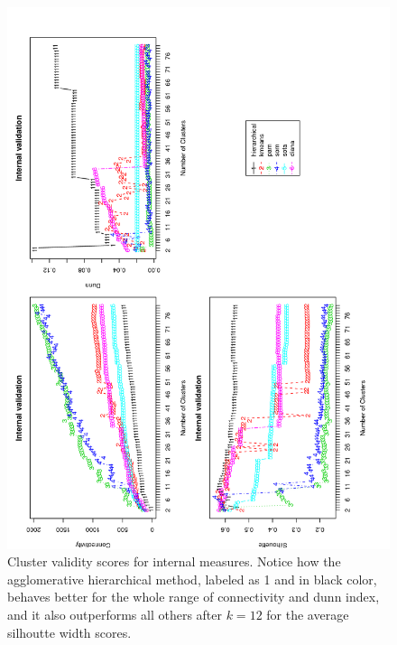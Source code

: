 \begin{figure}
 \centering
\includegraphics[angle=0, scale=0.4]{Chapter2/STval_int.png}
\caption{Cluster validity scores for internal measures. Notice how the
  agglomerative hierarchical method, labeled as 1 and in black color,
  behaves better for the whole range of connectivity and dunn index,
  and it also outperforms all others after $k=12$ for the average
  silhoutte width scores.}
 \label{fig:internal}
\end{figure}

